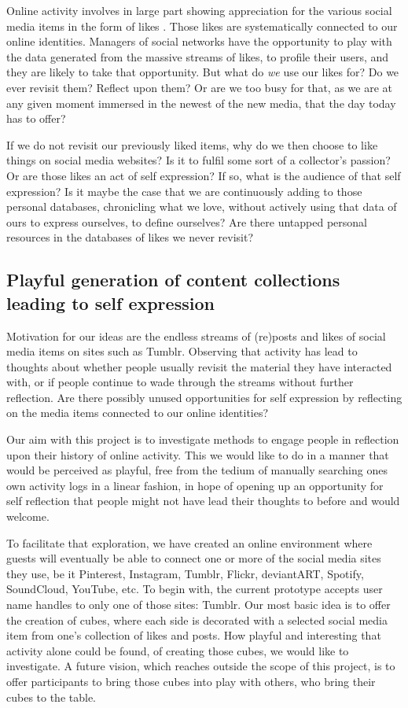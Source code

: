\documentclass[]{article}
\begin{document}
Online activity involves in large part showing appreciation for the various social media items in the form of likes \cite{LM11}.  Those likes are systematically connected to our online identities.  Managers of social networks have the opportunity to play with the data generated from the massive streams of likes, to profile their users, and they are likely to take that opportunity.  
But what do \textit{we} use our likes for?  Do we ever revisit them?  Reflect upon them?  Or are we too busy for that, as we are at any given moment immersed in the newest of the new media, that the day today has to offer?

If we do not revisit our previously liked items, why do we then choose to like things on social media websites?  Is it to fulfil some sort of a collector’s passion?  Or are those likes an act of self expression?  If so, what is the audience of that self expression?  Is it maybe the case that we are continuously adding to those personal databases, chronicling what we love, without actively using that data of ours to express ourselves, to define ourselves?  Are there untapped personal resources in the databases of likes we never revisit?


\subsection{Playful generation of content collections leading to self expression}

Motivation for our ideas are the endless streams of (re)posts and likes of social media items on sites such as Tumblr.  Observing that activity has lead to thoughts about whether people usually revisit the material they have interacted with, or if people continue to wade through the streams without further reflection.  Are there possibly unused opportunities for self expression by reflecting on the media items connected to our online identities? 

Our aim with this project is to investigate methods to engage people in reflection upon their history of online activity.  This we would like to do in a manner that would be perceived as playful, free from the tedium of manually searching ones own activity logs in a linear fashion, in hope of opening up an opportunity for self reflection that people might not have lead their thoughts to before and would welcome.

To facilitate that exploration, we have created an online environment where guests will eventually be able to connect one or more of the social media sites they use, be it Pinterest, Instagram, Tumblr, Flickr, deviantART, Spotify, SoundCloud, YouTube, etc.  To begin with, the current prototype accepts user name handles to only one of those sites:  Tumblr.  Our most basic idea is to offer the creation of cubes, where each side is decorated with a selected social media item from one's collection of likes and posts.  How playful and interesting that activity alone could be found, of creating those cubes, we would like to investigate.  A future vision, which reaches outside the scope of this project, is to offer participants to bring those cubes into play with others, who bring their cubes to the table.
\end{document}
